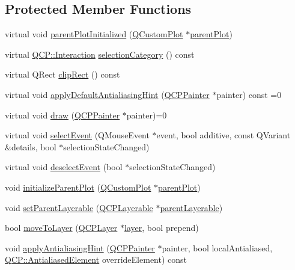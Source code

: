 \subsection*{Protected Member Functions}
\begin{DoxyCompactItemize}
\item 
virtual void \hyperlink{classQCPLayerable_ab20b7dbd8e0249ed61adb9622c427382}{parent\+Plot\+Initialized} (\hyperlink{classQCustomPlot}{Q\+Custom\+Plot} $\ast$\hyperlink{classQCPLayerable_ab7e0e94461566093d36ffc0f5312b109}{parent\+Plot})
\item 
virtual \hyperlink{namespaceQCP_a2ad6bb6281c7c2d593d4277b44c2b037}{Q\+C\+P\+::\+Interaction} \hyperlink{classQCPLayerable_aa4035e586b7f317a06ba7e74e242a5ea}{selection\+Category} () const 
\item 
virtual Q\+Rect \hyperlink{classQCPLayerable_a07a8f746640c3704b09910df297afcba}{clip\+Rect} () const 
\item 
virtual void \hyperlink{classQCPLayerable_afdf83ddc6a265cbf4c89fe99d3d93473}{apply\+Default\+Antialiasing\+Hint} (\hyperlink{classQCPPainter}{Q\+C\+P\+Painter} $\ast$painter) const =0
\item 
virtual void \hyperlink{classQCPLayerable_aecf2f7087482d4b6a78cb2770e5ed12d}{draw} (\hyperlink{classQCPPainter}{Q\+C\+P\+Painter} $\ast$painter)=0
\item 
virtual void \hyperlink{classQCPLayerable_a7498c2d0d081cf7cad0fb3bb93aa0e91}{select\+Event} (Q\+Mouse\+Event $\ast$event, bool additive, const Q\+Variant \&details, bool $\ast$selection\+State\+Changed)
\item 
virtual void \hyperlink{classQCPLayerable_ae546370644a5551c76af739afc008bee}{deselect\+Event} (bool $\ast$selection\+State\+Changed)
\item 
void \hyperlink{classQCPLayerable_a8cbe5a0c9a5674249982f5ca5f8e02bc}{initialize\+Parent\+Plot} (\hyperlink{classQCustomPlot}{Q\+Custom\+Plot} $\ast$\hyperlink{classQCPLayerable_ab7e0e94461566093d36ffc0f5312b109}{parent\+Plot})
\item 
void \hyperlink{classQCPLayerable_aa23c893671f1f6744ac235cf2204cf3a}{set\+Parent\+Layerable} (\hyperlink{classQCPLayerable}{Q\+C\+P\+Layerable} $\ast$\hyperlink{classQCPLayerable_a98d79f5b716d45eac4347befe546d0ec}{parent\+Layerable})
\item 
bool \hyperlink{classQCPLayerable_af94484cfb7cbbddb7de522e9be71d9a4}{move\+To\+Layer} (\hyperlink{classQCPLayer}{Q\+C\+P\+Layer} $\ast$\hyperlink{classQCPLayerable_aea67e8c19145e70d68c286a36f6b8300}{layer}, bool prepend)
\item 
void \hyperlink{classQCPLayerable_a62bd552d1a45aa9accb24b310542279e}{apply\+Antialiasing\+Hint} (\hyperlink{classQCPPainter}{Q\+C\+P\+Painter} $\ast$painter, bool local\+Antialiased, \hyperlink{namespaceQCP_ae55dbe315d41fe80f29ba88100843a0c}{Q\+C\+P\+::\+Antialiased\+Element} override\+Element) const 
\end{DoxyCompactItemize}
